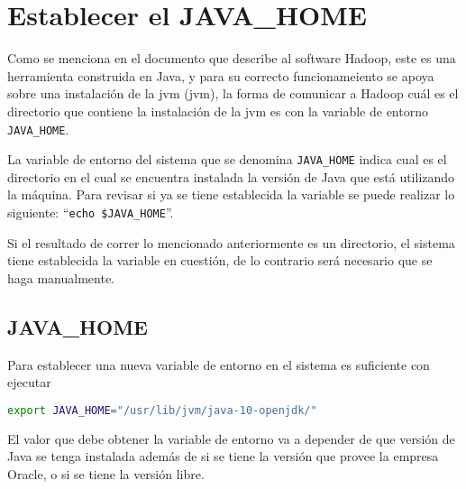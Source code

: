 \section{Establecer el JAVA\_HOME}
\label{sec:establecer_java_home}

Como se menciona en el documento que describe al software
Hadoop\cite{ramirez2021}, este es una
herramienta construida en Java, y para su correcto funcionameiento se apoya
sobre una instalación de la \acrlong{jvm} (\acrshort{jvm}), la forma de
comunicar a Hadoop cuál es el directorio que contiene la instalación de la
\acrshort{jvm} es con la variable de entorno {\tt JAVA\_HOME}.

La variable de entorno del sistema que se denomina {\tt JAVA\_HOME} indica cual
es el directorio en el cual se encuentra instalada la versión de Java que está
utilizando la máquina. Para revisar si ya se tiene establecida la variable se
puede realizar lo siguiente: ``{\tt echo \$JAVA\_HOME}''.

Si el resultado de correr lo mencionado anteriormente es un directorio, el
sistema tiene establecida la variable en cuestión, de lo contrario será
necesario que se haga manualmente.

\subsection*{JAVA\_HOME}
Para establecer una nueva variable de entorno en el sistema es suficiente con
ejecutar 

\begin{lstlisting}[language=bash, caption=Exportar variable de entorno,
label=lst:exportar_java_home]
export JAVA_HOME="/usr/lib/jvm/java-10-openjdk/"
\end{lstlisting}

El valor que debe obtener la variable de entorno va a depender de que versión
de Java se tenga instalada además de si se tiene la versión que provee la
empresa Oracle, o si se tiene la versión libre.
